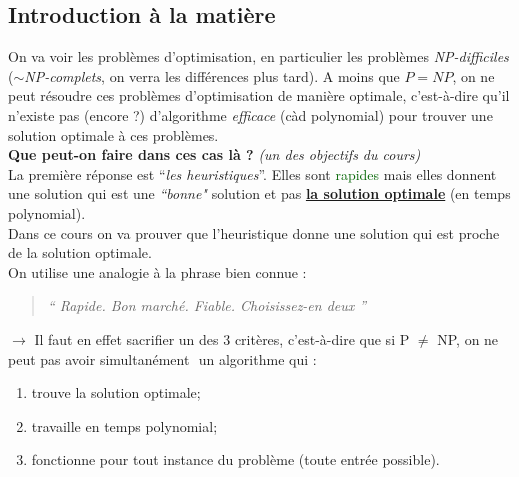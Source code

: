 \documentclass{article}
\newcommand{\gre}[1]{\textcolor{darkgreen}{#1}}
\newcommand{\quotecolor}[1]{\textcolor{quote}{#1}}
\begin{document}
\begin{sffamily}
\subsection{Introduction à la matière}

On va voir les problèmes d'optimisation, en particulier les problèmes
\textit{NP-difficiles} ($\sim$\textit{NP-complets}, on verra  les différences
plus tard). A moins que $P = NP$, on ne peut résoudre ces problèmes
d'optimisation de manière optimale, c'est-à-dire qu'il n'existe pas (encore ?)
d'algorithme \textit{efficace} (càd polynomial) pour trouver une solution
optimale à ces problèmes. \\

\textbf{Que peut-on faire dans ces cas là ?}\textit{ (un des objectifs du cours)} \\

\noindent La première réponse est ``\textit{les heuristiques}''. Elles sont
\gre{rapides} mais elles donnent une solution qui est une \textit{``bonne"}
solution et pas \textbf{\underline{la solution optimale}} (en temps
polynomial).\\ Dans ce cours on va prouver que l'heuristique donne une solution
qui est proche de la solution optimale. \\

\noindent On utilise une analogie à la phrase bien connue :
\begin{quote}\begin{center}
\textit{\quotecolor{{\Huge ``}}
Rapide. Bon marché. Fiable. Choisissez-en deux
\quotecolor{{\Huge ''}}}
\end{center}\end{quote}

$\longrightarrow$ Il faut en effet sacrifier un des 3 critères, c'est-à-dire
que si P $\neq$ NP, on ne peut pas avoir simultanément
\indent $ $ un algorithme qui :
\begin{enumerate}
\item trouve la solution optimale;
\item travaille en temps polynomial;
\item fonctionne pour tout instance du problème (toute entrée possible). \\
\end{enumerate}


\end{sffamily}
\end{document}
